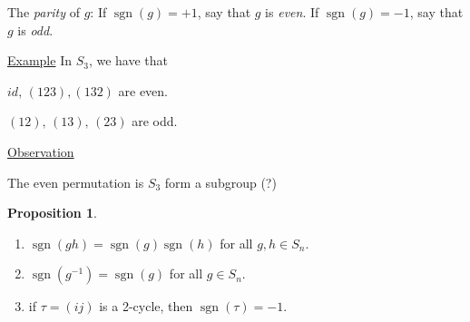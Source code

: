 \documentclass{article}
\theoremstyle{definition}
\newtheorem{proposition}[theorem]{Proposition}
\DeclareMathOperator{\sgn}{sgn}
\begin{document}
The \emph{parity} of $g$: If $\sgn(g)=+1$, say that $g$ is \emph{even}.
If $\sgn(g)=-1$, say that $g$ is \emph{odd}.

\underline{Example}
In $S_3$, we have that 

$id,\,(1 2 3), (1 3 2)$ are even.

$(1 2),\, (1 3),\,(2 3)$ are odd.

\underline{Observation}

The even permutation is $S_3$ form a subgroup (?)

\begin{proposition}
  \label{prp:sgn}
  \begin{enumerate}
    \item $\sgn(gh)=\sgn(g)\sgn(h)$ for all $g,h \in S_n$.
    \item $\sgn(g^{-1})=\sgn(g)$ for all $g \in S_n$.
    \item if $\tau=(i j)$ is a 2-cycle, then $\sgn(\tau)=-1$.
  \end{enumerate}
\end{proposition}
\end{document}
